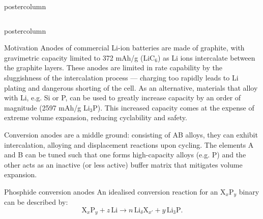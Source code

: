 \documentclass{beamer}
\begin{document}
\begin{frame}
\begin{columns}
\begin{column}{.65\textwidth}
\begin{beamercolorbox}[center]{postercolumn}
\begin{minipage}{.98\textwidth}
{\begin{columns}
\begin{column}{.48\textwidth}
\begin{beamercolorbox}[left]{postercolumn}
\begin{minipage}{\textwidth}
{\begin{myblock}{Motivation}
              Anodes of commercial Li-ion batteries are made of graphite, with gravimetric capacity limited to 372 mAh/g (LiC$_6$) as Li ions intercalate between the graphite layers. These anodes are limited in rate capability by the sluggishness of the intercalation process --- charging too rapidly leads to Li plating and dangerous shorting of the cell. As an alternative, materials that alloy with Li, e.g. Si or P, can be used to greatly increase capacity by an order of magnitude (2597 mAh/g Li$_3$P). This increased capacity comes at the expense of extreme volume expansion, reducing cyclability and safety.

Conversion anodes are a middle ground: consisting of AB alloys, they can exhibit intercalation, alloying and displacement reactions upon cycling. The elements A and B can be tuned such that one forms high-capacity alloys (e.g. P) and the other acts as an inactive (or less active) buffer matrix that mitigates volume expansion.

					\end{myblock}
					\begin{myblock}{Phosphide conversion anodes}
              An idealised conversion reaction for an X$_x$P$_y$ binary can be described by:
          \[ \text{X}_x \text{P}_y + z\,\text{Li} \to n\,\text{Li}_\delta\text{X}_{x'} + y\,\text{Li}_3\text{P}.\]


\end{myblock}}
\end{minipage}
\end{beamercolorbox}
\end{column}
\end{columns}}
\end{minipage}
\end{beamercolorbox}
\end{column}
\end{columns}
\end{frame}
\end{document}
